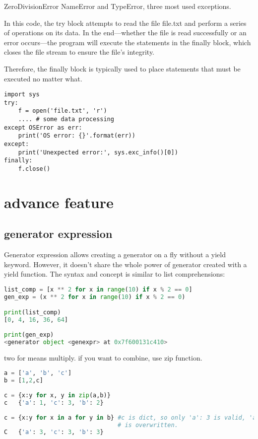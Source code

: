\documentclass[a4paper,12pt,twoside]{book}
\begin{document}
ZeroDivisionError NameError and TypeError, three most used exceptions.

In this code, the try block attempts to read the file file.txt and perform a series of operations on its data. In the end—whether the file is read successfully or an error occurs—the program will execute the statements in the finally block, which closes the file stream to ensure the file’s integrity.

Therefore, the finally block is typically used to place statements that must be executed no matter what.

\begin{lstlisting}
import sys
try:
	f = open('file.txt', 'r')
	.... # some data processing
except OSError as err:
	print('OS error: {}'.format(err))
except:
	print('Unexpected error:', sys.exc_info()[0])
finally:
	f.close()
\end{lstlisting}


	
\section{advance feature}
\subsection{generator expression}

Generator expression allows creating a generator on a fly without a yield keyword. However, it doesn’t share the whole power of generator created with a yield function. The syntax and concept is similar to list comprehensions:
\begin{lstlisting}[frame=single, language=Python]
list_comp = [x ** 2 for x in range(10) if x % 2 == 0]
gen_exp = (x ** 2 for x in range(10) if x % 2 == 0)

print(list_comp)
[0, 4, 16, 36, 64]
	
print(gen_exp)
<generator object <genexpr> at 0x7f600131c410>  
\end{lstlisting}  
	
two for means multiply. if you want to combine, use zip function. 
\begin{lstlisting}[frame=single, language=Python]	
a = ['a', 'b', 'c']
b = [1,2,c]
	
c = {x:y for x, y in zip(a,b)}
c	{'a': 1, 'c': 3, 'b': 2}
	
c = {x:y for x in a for y in b} #c is dict, so only 'a': 3 is valid, 'a':1
                                # is overwritten.
C	{'a': 3, 'c': 3, 'b': 3}
\end{lstlisting}  	
		
\end{document}
